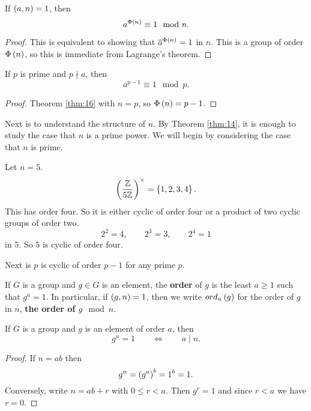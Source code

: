 \begin{theorem}
\label{thm:16}
If $ \left( a, n \right) = 1 $, then
$$ a^{\Phi\left( n \right)} \equiv 1 \mod n. $$
\end{theorem}

\begin{proof}
This is equivalent to showing that $ \overline{a}^{\Phi\left( n \right)} = 1 $ in $ \unit{n} $. This is a group of order $ \Phi\left( n \right) $, so this is immediate from Lagrange's theorem.
\end{proof}

\begin{corollary}
If $ p $ is prime and $ p \nmid a $, then
$$ a^{p - 1} \equiv 1 \mod p. $$
\end{corollary}

\begin{proof}
Theorem \ref{thm:16} with $ n = p $, so $ \Phi\left( n \right) = p - 1 $.
\end{proof}

Next is to understand the structure of $ \unit{n} $. By Theorem \ref{thm:14}, it is enough to study the case that $ n $ is a prime power. We will begin by considering the case that $ n $ is prime.

\begin{example2}
Let $ n = 5 $.
$$ \left( \dfrac{\mathbb{Z}}{5\mathbb{Z}} \right)^\times = \left\{ 1, 2, 3, 4 \right\}. $$
This has order four. So it is either cyclic of order four or a product of two cyclic groups of order two.
$$ 2^2 = 4, \qquad 2^3 = 3, \qquad 2^4 = 1 $$
in $ \unit{5} $. So $ \unit{5} $ is cyclic of order four.
\end{example2}

Next is $ \unit{p} $ is cyclic of order $ p - 1 $ for any prime $ p $.


\begin{definition}
If $ G $ is a group and $ g \in G $ is an element, the \textbf{order} of $ g $ is the least $ a \ge 1 $ such that $ g^a = 1 $. In particular, if $ \left( g, n \right) = 1 $, then we write $ ord_n\left( g \right) $ for the order of $ g $ in $ \unit{n} $, \textbf{the order of $ g \mod n $}.
\end{definition}

\begin{proposition}
\label{prop:19}
If $ G $ is a group and $ g $ is an element of order $ a $, then
$$ g^n = 1 \qquad \iff \qquad a \mid n. $$
\end{proposition}

\begin{proof}
If $ n = ab $ then
$$ g^n = \left( g^a \right)^b = 1^b = 1. $$
Conversely, write $ n = ab + r $ with $ 0 \le r < a $. Then $ g^r = 1 $ and since $ r < a $ we have $ r = 0 $.
\end{proof}

